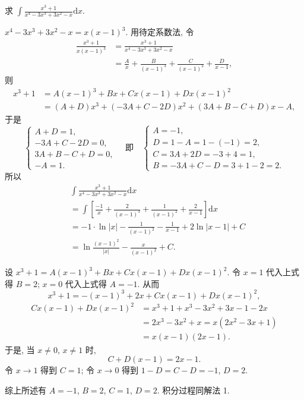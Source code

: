 \begin{example}\label{ex:5.3.6}
求 $\int\frac{x^{3}+1}{x^{4}-3x^{3}+3x^{2}-x}\mathrm{d}x$.
\end{example}

\begin{solution}[解法 1]
$x^{4}-3x^{3}+3x^{2}-x=x(x-1)^{3}$. 用待定系数法, 令
\begin{align*}
\frac{x^{3}+1}{x(x-1)^{3}}&=\frac{x^{3}+1}{x^{4}-3x^{3}+3x^{2}-x}\\
&=\frac{A}{x}+\frac{B}{(x-1)^{3}}+\frac{C}{(x-1)^{2}}+\frac{D}{x-1},
\end{align*}
则
\begin{align*}
x^{3}+1&=A(x-1)^{3}+Bx+Cx(x-1)+Dx(x-1)^{2}\\
&=(A+D)x^{3}+(-3A+C-2D)x^{2}+(3A+B-C+D)x-A,
\end{align*}
于是
\[
\begin{cases}
A+D=1,\\
-3A+C-2D=0,\\
3A+B-C+D=0,\\
-A=1.
\end{cases}\quad
\text{即}\quad
\begin{cases}
A=-1,\\
D=1-A=1-(-1)=2,\\
C=3A+2D=-3+4=1,\\
B=-3A+C-D=3+1-2=2.
\end{cases}
\]
所以
\begin{align*}
&\int\frac{x^{3}+1}{x^{4}-3x^{3}+3x^{2}-x}\mathrm{d}x\\
&=\int\left[\frac{-1}{x}+\frac{2}{(x-1)^{3}}+\frac{1}{(x-1)^{2}}+\frac{2}{x-1}\right]\mathrm{d}x\\
&=-1\cdot\ln|x|-\frac{1}{(x-1)^{2}}-\frac{1}{x-1}+2\ln|x-1|+C\\
&=\ln\frac{(x-1)^{2}}{|x|}-\frac{x}{(x-1)^{2}}+C.
\end{align*}
\end{solution}

\begin{solution}[解法 2]
设 $x^{3}+1=A(x-1)^{3}+Bx+Cx(x-1)+Dx(x-1)^{2}$. 令 $x=1$ 代入上式得 $B=2$; $x=0$ 代入上式得 $A=-1$. 从而
\[
x^{3}+1=-(x-1)^{3}+2x+Cx(x-1)+Dx(x-1)^{2},
\]
\begin{align*}
Cx(x-1)+Dx(x-1)^{2}&=x^{3}+1+x^{3}-3x^{2}+3x-1-2x\\
&=2x^{3}-3x^{2}+x=x(2x^{2}-3x+1)\\
&=x(x-1)(2x-1).
\end{align*}
于是, 当 $x\neq 0$, $x\neq 1$ 时,
\[
C+D(x-1)=2x-1.
\]
令 $x\to 1$ 得到 $C=1$; 令 $x\to 0$ 得到 $1-D=C-D=-1$, $D=2$.

综上所述有 $A=-1$, $B=2$, $C=1$, $D=2$. 积分过程同解法 1.
\end{solution}

